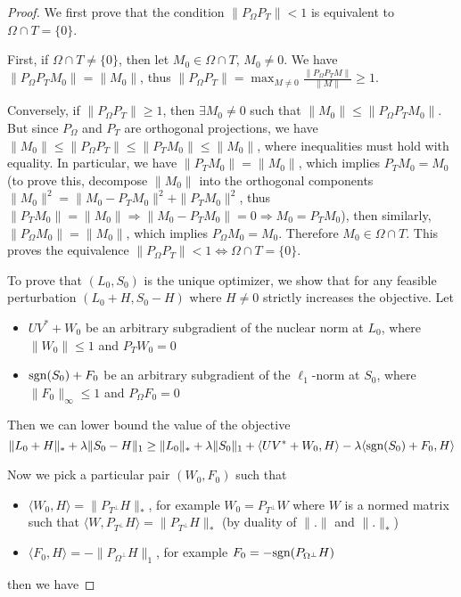 \begin{proof}
We first prove that the condition $\|P_\Omega P_T\| < 1$ is equivalent to $\Omega \cap T = \{0\}$.

First, if $\Omega \cap T \neq \{0\}$, then let $M_0 \in \Omega \cap T$, $M_0 \neq 0$. We have $\| P_\Omega P_T M_0\| = \|M_0\|$, thus $\| P_\Omega P_T\| = \max_{M \neq 0} \frac{\| P_\Omega P_T M\|}{\|M\|} \geq 1$.

Conversely, if $\| P_\Omega P_T\| \geq 1$, then $\exists M_0 \neq 0$ such that $\|M_0\| \leq \| P_\Omega P_T M_0\|$. But since $P_\Omega$ and $P_T$ are orthogonal projections, we have $\|M_0\| \leq \| P_\Omega P_T\| \leq \|P_T M_0\| \leq \|M_0\|$, where inequalities must hold with equality. In particular, we have $\|P_T M_0\| = \|M_0\|$, which implies $P_T M_0 = M_0$ (to prove this, decompose $\|M_0\|$ into the orthogonal components $\|M_0\|^2 = \|M_0 - P_TM_0\|^2 + \|P_TM_0\|^2$, thus $\|P_TM_0\| = \|M_0\| \Rightarrow \|M_0 - P_TM_0\| = 0 \Rightarrow M_0 = P_T M_0$), then similarly, $\|P_\Omega M_0\| = \|M_0\|$, which implies $P_\Omega M_0 = M_0$. Therefore $M_0 \in \Omega \cap T$. This proves the equivalence $\|P_\Omega P_T\| < 1 \Leftrightarrow \Omega \cap T = \{0\}$.



To prove that $(L_0, S_0)$ is the unique optimizer, we show that for any feasible perturbation $(L_0 + H, S_0 - H)$ where $H \neq 0$ strictly increases the objective. Let
\begin{itemize}
\item $UV^* + W_0$ be an arbitrary subgradient of the nuclear norm at $L_0$, where $\|W_0\| \leq 1$ and $P_T W_0 = 0$
\item $\text{sgn} (S_0) + F_0$ be an arbitrary subgradient of the $\ell_1$-norm at $S_0$, where $\|F_0\|_\infty \leq 1$ and $P_\Omega F_0 = 0$
\end{itemize}

Then we can lower bound the value of the objective
\[
\|L_0 + H\|_* + \lambda \|S_0 - H\|_1 \geq \|L_0\|_* + \lambda \|S_0\|_1 + \langle UV^* + W_0, H\rangle - \lambda \langle \text{sgn}(S_0) + F_0, H\rangle
\]

Now we pick a particular pair $(W_0, F_0)$ such that
\begin{itemize}
\item $\langle W_0, H \rangle = \|P_{T^\perp} H\|_*$, for example $W_0 = P_{T^\perp} W$ where $W$ is a normed matrix such that $\langle W, P_{T^\perp} H \rangle = \|P_{T^\perp} H\|_*$ (by duality of $\|.\|$ and $\|.\|_*$)
\item $\langle F_0, H \rangle = -\|P_{\Omega^\perp} H\|_1$, for example $F_0 = -\text{sgn}(P_{\Omega^\perp} H)$
\end{itemize}
then we have


\end{proof}
